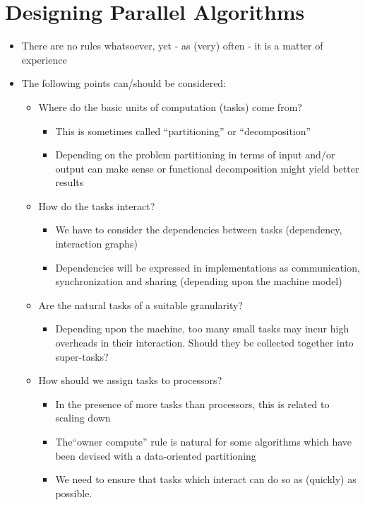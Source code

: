 \documentclass[a4paper]{article}
\begin{document}
\section{Designing Parallel Algorithms}
\begin{itemize}
\item There are no rules whatsoever, yet - as (very) often - it is a matter of experience
\item The following points can/should be considered:
\begin{itemize}
\item Where do the basic units of computation (tasks) come from? 
\begin{itemize}
\item This is sometimes called ``partitioning'' or ``decomposition''
\item Depending on the problem partitioning in terms of input and/or output can make sense or functional decomposition might yield better results
\end{itemize}
\item How do the tasks interact? 
\begin{itemize}
\item We have to consider the dependencies between tasks (dependency, interaction graphs)
\item Dependencies will be expressed in implementations as communication, synchronization and sharing (depending upon the machine model)
\end{itemize}
\item Are the natural tasks of a suitable granularity? 
\begin{itemize}
\item Depending upon the machine, too many small tasks may incur high overheads in their interaction. Should they be collected together into super-tasks?
\end{itemize}
\item How should we assign tasks to processors? 
\begin{itemize}
\item In the presence of more tasks than processors, this is related to scaling down
\item The``owner compute'' rule is natural for some algorithms which have been devised with a data-oriented partitioning
\item We need to ensure that tasks which interact can do so as (quickly) as possible.
\end{itemize}
\end{itemize}

\end{itemize}
\end{document}
